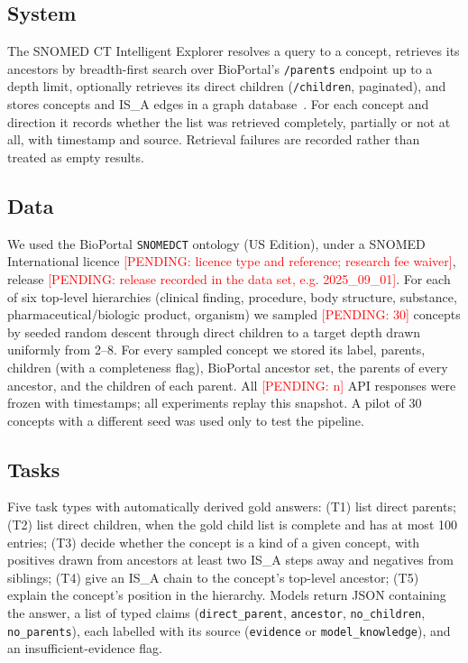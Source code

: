 \documentclass[11pt]{article}
\newcommand{\pending}[1]{\textcolor{red}{[PENDING: #1]}}
\begin{document}
\subsection{System}
The SNOMED CT Intelligent Explorer resolves a query to a concept, retrieves its ancestors by breadth-first search over BioPortal's \texttt{/parents} endpoint up to a depth limit, optionally retrieves its direct children (\texttt{/children}, paginated), and stores concepts and IS\_A edges in a graph database~\citep{whetzel2011bioportal}. For each concept and direction it records whether the list was retrieved completely, partially or not at all, with timestamp and source. Retrieval failures are recorded rather than treated as empty results.

\subsection{Data}
We used the BioPortal \texttt{SNOMEDCT} ontology (US Edition), under a SNOMED International licence \pending{licence type and reference; research fee waiver}, release \pending{release recorded in the data set, e.g. 2025\_09\_01}. For each of six top-level hierarchies (clinical finding, procedure, body structure, substance, pharmaceutical/biologic product, organism) we sampled \pending{30} concepts by seeded random descent through direct children to a target depth drawn uniformly from 2--8. For every sampled concept we stored its label, parents, children (with a completeness flag), BioPortal ancestor set, the parents of every ancestor, and the children of each parent. All \pending{n} API responses were frozen with timestamps; all experiments replay this snapshot. A pilot of 30 concepts with a different seed was used only to test the pipeline.

\subsection{Tasks}
Five task types with automatically derived gold answers: (T1) list direct parents; (T2) list direct children, when the gold child list is complete and has at most 100 entries; (T3) decide whether the concept is a kind of a given concept, with positives drawn from ancestors at least two IS\_A steps away and negatives from siblings; (T4) give an IS\_A chain to the concept's top-level ancestor; (T5) explain the concept's position in the hierarchy. Models return JSON containing the answer, a list of typed claims (\texttt{direct\_parent}, \texttt{ancestor}, \texttt{no\_children}, \texttt{no\_parents}), each labelled with its source (\texttt{evidence} or \texttt{model\_knowledge}), and an insufficient-evidence flag.
\end{document}
